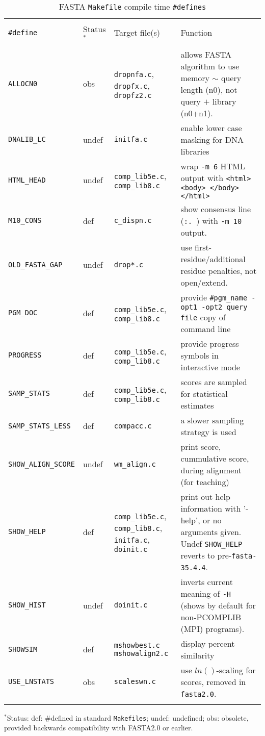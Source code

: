 \documentclass[11pt]{article}
\begin{document}
\begin{table}
\caption{\label{make-defs}FASTA \texttt{Makefile} compile time \texttt{\#defines}}
\vspace{1.0ex}
\begin{tabular}{l l p{1.00 in} p{3.0 in}}
\hline\\[-1.2ex]
\texttt{\#define} & Status$^*$ & Target file(s) & Function \\[1.0ex]
\hline\\[-1.5ex]
\texttt{ALLOCN0} & obs & \texttt{dropnfa.c}, \texttt{dropfx.c}, \texttt{dropfz2.c} & allows FASTA algorithm to use memory $\sim$ query length (n0), not query $+$ library (n0+n1). \\
\texttt{DNALIB\_LC} & undef & \texttt{initfa.c} & enable lower case masking for DNA libraries \\
\texttt{HTML\_HEAD} & undef & \texttt{comp\_lib5e.c}, \texttt{comp\_lib8.c} & wrap \texttt{-m 6} HTML output with \texttt{<html> <body> </body> </html>} \\
\texttt{M10\_CONS} & def & \texttt{c\_dispn.c} & show consensus line (\texttt{:. }) with \texttt{-m 10} output. \\
\texttt{OLD\_FASTA\_GAP} & undef & \texttt{drop*.c} & use first-residue/additional residue penalties, not open/extend. \\
\texttt{PGM\_DOC} & def & \texttt{comp\_lib5e.c}, \texttt{comp\_lib8.c}  & provide \texttt{\#pgm\_name -opt1 -opt2 query file} copy of command line \\
\texttt{PROGRESS} & def & \texttt{comp\_lib5e.c}, \texttt{comp\_lib8.c}  & provide progress symbols in interactive mode \\
\texttt{SAMP\_STATS} & def & \texttt{comp\_lib5e.c}, \texttt{comp\_lib8.c}  & scores are sampled for statistical estimates \\
\texttt{SAMP\_STATS\_LESS} & def & \texttt{compacc.c} & a slower sampling strategy is used \\
\texttt{SHOW\_ALIGN\_SCORE} & undef & \texttt{wm\_align.c} & print score, cummulative score, during alignment (for teaching) \\
\texttt{SHOW\_HELP} & def & \texttt{comp\_lib5e.c}, \texttt{comp\_lib8.c}, \texttt{initfa.c}, \texttt{doinit.c} & print out help information with '-help', or no arguments given.  Undef \texttt{SHOW\_HELP} reverts to pre-\texttt{fasta-35.4.4}.\\
\texttt{SHOW\_HIST} & undef & \texttt{doinit.c} & inverts current meaning of \texttt{-H} (shows by default for non-PCOMPLIB (MPI) programs). \\
\texttt{SHOWSIM} & def & \texttt{mshowbest.c} \texttt{mshowalign2.c} & display percent similarity \\
\texttt{USE\_LNSTATS} & obs & \texttt{scaleswn.c} & use $ln()$-scaling for scores, removed in \texttt{fasta2.0}.\\
\hline \\
\end{tabular}
$^*$Status: def: \#defined in standard \texttt{Makefiles}; undef: undefined; obs: obsolete, provided backwards compatibility with FASTA2.0 or earlier.
\end{table}
\end{document}
